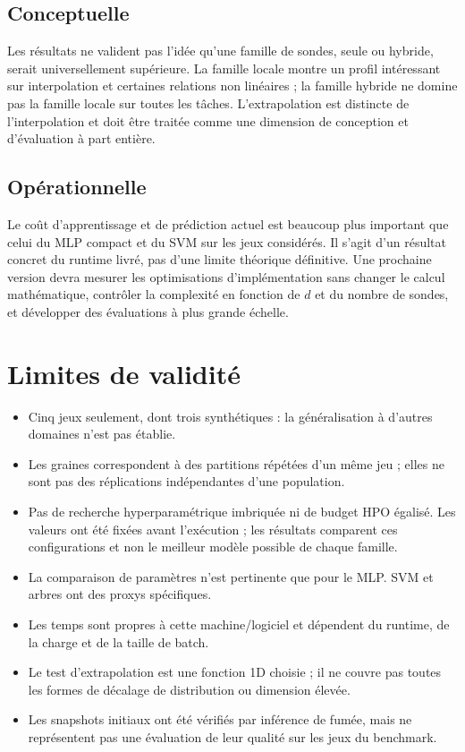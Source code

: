\documentclass[11pt,a4paper]{article}
\begin{document}
\subsection{Conceptuelle}
Les résultats ne valident pas l'idée qu'une famille de sondes, seule ou hybride, serait universellement supérieure. La famille locale montre un profil intéressant sur interpolation et certaines relations non linéaires ; la famille hybride ne domine pas la famille locale sur toutes les tâches. L'extrapolation est distincte de l'interpolation et doit être traitée comme une dimension de conception et d'évaluation à part entière.

\subsection{Opérationnelle}
Le coût d'apprentissage et de prédiction actuel est beaucoup plus important que celui du MLP compact et du SVM sur les jeux considérés. Il s'agit d'un résultat concret du runtime livré, pas d'une limite théorique définitive. Une prochaine version devra mesurer les optimisations d'implémentation sans changer le calcul mathématique, contrôler la complexité en fonction de $d$ et du nombre de sondes, et développer des évaluations à plus grande échelle.

\section{Limites de validité}
\begin{itemize}
\item Cinq jeux seulement, dont trois synthétiques : la généralisation à d'autres domaines n'est pas établie.
\item Les graines correspondent à des partitions répétées d'un même jeu ; elles ne sont pas des réplications indépendantes d'une population.
\item Pas de recherche hyperparamétrique imbriquée ni de budget HPO égalisé. Les valeurs ont été fixées avant l'exécution ; les résultats comparent ces configurations et non le meilleur modèle possible de chaque famille.
\item La comparaison de paramètres n'est pertinente que pour le MLP. SVM et arbres ont des proxys spécifiques.
\item Les temps sont propres à cette machine/logiciel et dépendent du runtime, de la charge et de la taille de batch.
\item Le test d'extrapolation est une fonction 1D choisie ; il ne couvre pas toutes les formes de décalage de distribution ou dimension élevée.
\item Les snapshots initiaux ont été vérifiés par inférence de fumée, mais ne représentent pas une évaluation de leur qualité sur les jeux du benchmark.
\end{itemize}
\end{document}
